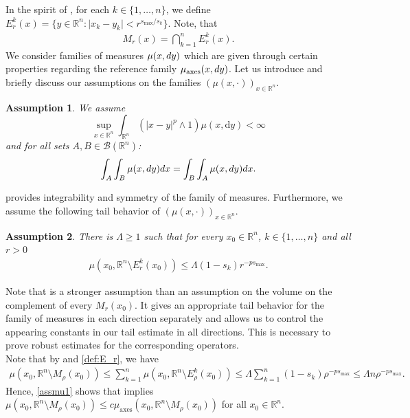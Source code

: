 \documentclass[11pt]{amsart}
\theoremstyle{plain}
\newtheorem{assumption}{Assumption}
\theoremstyle{definition}
\numberwithin{equation}{section}
\renewcommand{\d}{\textnormal{d}}
\newcommand{\R}{\mathbb{R}}
\newcommand{\ma}{\mu_{\mathrm{axes}}}
\begin{document}
In the spirit of \cite{CKW19}, for each $k \in \lbrace 1,\dots,n\rbrace$, we define $E_r^k(x) = \lbrace y \in \R^n : \vert x_k - y_k \vert < r^{s_{\max}/{s_k}}\rbrace$. Note, that
\begin{align}
\label{def:E_r}
M_r(x) = \bigcap_{k = 1}^n E_r^k(x).
\end{align}
We consider families of measures $\mu(x,\d y)$ which are given through certain properties regarding the reference family $\ma(x,\d y)$.
Let us introduce and briefly discuss our assumptions on the families $(\mu(x,\cdot))_{x\in\R^n}$.
\begin{assumption}\label{assumption:symmetry}
We assume
\begin{equation*}
\sup_{x\in\R^n} \int_{\mathbb{R}^n} (|x-y|^p \land 1) \mu(x,\mathrm{d}y) < \infty
\end{equation*}
and for all sets $A,B \in \mathcal{B}(\R^n)$:
\begin{align*}
\int_A \int_B \mu(x,\d y) \d x = \int_B \int_A \mu(x,\d y) \d x.
\end{align*}
\end{assumption}
 provides integrability and symmetry of the family of measures. 
Furthermore, we assume the following tail behavior of $(\mu(x,\cdot))_{x\in\R^n}$.
\begin{assumption}\label{assumption:tail}
There is $\Lambda\geq 1$ such that for every $x_0 \in \R^n$, $k \in \lbrace 1, \dots , n \rbrace$ and all $r>0$
\begin{align*}
\mu(x_0, \R^n \setminus E_{r}^k(x_0)) \le 
\Lambda (1-s_k)r^{-ps_{\max}}.
\end{align*}
\end{assumption}
Note that  is a stronger assumption than an assumption on the volume on the complement of every $M_r(x_0)$. It gives an appropriate tail behavior for the family of measures in each direction separately and allows us to control the appearing constants in our tail estimate in all directions. This is necessary to prove robust estimates for the corresponding operators. \\
Note that by  and \eqref{def:E_r}, we have 
\begin{align}
\label{assmu1}
 \mu(x_0, \R^n \setminus M_{\rho}(x_0)) \le \sum_{k = 1}^n \mu(x_0, \R^n \setminus E_{\rho}^k(x_0)) \le \Lambda \sum_{k = 1}^n (1-s_k) \rho^{-ps_{\max}} \leq \Lambda n\rho^{-ps_{\max}}. 
 \end{align}
Hence, \eqref{assmu1} shows that  implies $\mu(x_0,\R^n\setminus M_{\rho}(x_0)) \leq c\ma(x_0,\R^n\setminus M_{\rho}(x_0))$ for all $x_0\in\R^n$. \\
\end{document}
